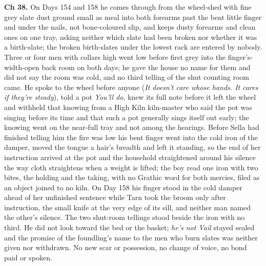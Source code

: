 \documentclass{design/chronicle}
\begin{document}
{\textbf{Ch 38.} On Days 154 and 158 he comes through from the wheel-shed with fine grey slate dust ground small as meal into both forearms past the bent little finger and under the nails, not bone-coloured slip, and keeps dusty forearms and clean ones on one tray, asking neither which slate had been broken nor whether it was a birth-slate; the broken birth-slates under the lowest rack are entered by nobody. Three or four men with collars high went low before first grey into the finger’s-width-open back room on both days; he gave the house no name for them and did not say the room was cold, and no third telling of the shut counting room came. He spoke to the wheel before anyone (\emph{It doesn’t care whose hands. It cares if they’re steady}), told a pot \emph{You’ll do}, knew its full note before it left the wheel and withheld that knowing from a High Kiln kiln-master who said the pot was singing before its time and that such a pot generally sings itself out early; the knowing went on the near-full tray and not among the hearings. Before Sella had finished telling him the fire was low his bent finger went into the cold iron of the damper, moved the tongue a hair’s breadth and left it standing, so the end of her instruction arrived at the pot and the household straightened around his silence the way cloth straightens when a weight is lifted; the boy read one iron with two bites, the holding and the taking, with no Grathic word for both mercies, filed as an object joined to no kiln. On Day 158 his finger stood in the cold damper ahead of her unfinished sentence while Tarn took the broom only after instruction, the small knife at the very edge of its sill, and neither man named the other’s silence. The two shut-room tellings stood beside the iron with no third. He did not look toward the bed or the basket; \emph{he’s not Vail} stayed sealed and the promise of the foundling’s name to the men who burn slates was neither given nor withdrawn. No new scar or possession, no change of voice, no bond paid or spoken.

}
\end{document}
